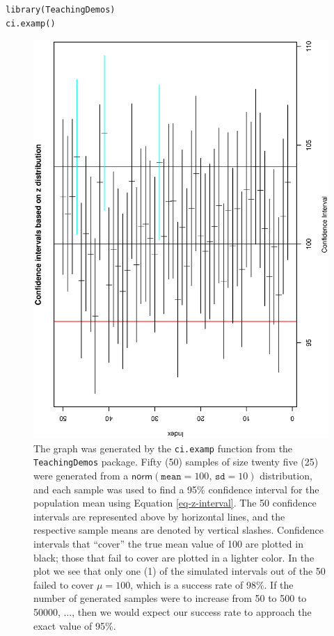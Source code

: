 \documentclass[captions=tableheading]{scrbook}
\begin{document}
\lstset{language=R}
\begin{lstlisting}
library(TeachingDemos)
ci.examp()
\end{lstlisting}





\begin{figure}[th]
  \includegraphics[angle=270, totalheight=4in]{ps/estimate/ci-examp.ps}
  \caption[Simulated confidence intervals]{\small The graph was generated by the \texttt{ci.examp} function from the \texttt{TeachingDemos} package. Fifty (50) samples of size twenty five (25) were generated from a \( \mathsf{norm}(\mathtt{mean}=100,\,\mathtt{sd}=10) \) distribution, and each sample was used to find a 95\% confidence interval for the population mean using Equation \ref{eq-z-interval}. The 50 confidence intervals are represented above by horizontal lines, and the respective sample means are denoted by vertical slashes. Confidence intervals that ``cover'' the true mean value of 100 are plotted in black; those that fail to cover are plotted in a lighter color. In the plot we see that only one (1) of the simulated intervals out of the 50 failed to cover \(\mu=100\), which is a success rate of 98\%. If the number of generated samples were to increase from 50 to 500 to 50000, ..., then we would expect our success rate to approach the exact value of 95\%.}
  \label{fig-ci-examp}
\end{figure}
\end{document}
